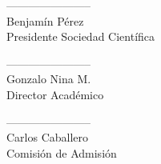 \documentclass[11pt,letterpaper]{article}
\begin{document}
\begin{minipage}{0.3\textwidth}
\begin{center}
-----------------------\\
Benjamín Pérez\\
Presidente Sociedad Científica\\
\end{center}
\end{minipage}
\begin{minipage}{0.9\textwidth}
\begin{center}
-----------------------\\
Gonzalo Nina M.\\
Director Académico\\
\end{center}
\end{minipage}
\vspace{2cm}
\begin{center}
-----------------------\\
Carlos Caballero\\
Comisión de Admisión\\
\end{center}
\end{document}
